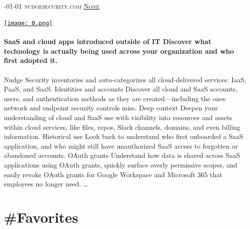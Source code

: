 \documentclass[10pt,a4paper]{article}
\begin{document}
\begin{multicols}{2}
\raggedcolumns
\noindent\begin{minipage}{\linewidth}
\medskip
\subsection{}
\textsc{\footnotesize
{\scriptsize\faCalendar}-01-01 
{\scriptsize\faGlobe}\space 
nudgesecurity.com 
{\scriptsize\faComments}\space 
\href{}{None} 
}
\par\medskip\noindent
\href{https://www.nudgesecurity.com/free-shadow-it-inventory?utm\_medium=sponsored\&utm\_source=hacker\_nl\&utm\_content=newsletter\&utm\_campaign=shadow\_it\&utm\_term=230825}{
    \texttt{[image: 0.png]}
}
\end{minipage}
\paragraph{}
\textbf{SaaS and cloud apps introduced outside of IT
Discover what technology is actually being used across your organization and who first adopted it.}
\paragraph{}
 Nudge Security inventories and auto-categorizes all cloud-delivered services: IaaS, PaaS, and SaaS.
Identities and accounts
Discover all cloud and SaaS accounts, users, and authentication methods as they are created—including the ones network and endpoint security controls miss.
Deep context
Deepen your understanding of cloud and SaaS use with visibility into resources and assets within cloud services, like files, repos, Slack channels, domains, and even billing information.
Historical use
Look back to understand who first onboarded a SaaS application, and who might still have unauthorized SaaS access to forgotten or abandoned accounts.
OAuth grants
Understand how data is shared across SaaS applications using OAuth grants, quickly surface overly permissive scopes, and easily revoke OAuth grants for Google Workspace and Microsoft 365 that employees no longer need.
\dots\par
\end{multicols}

\newpage
\section{\#Favorites}
\end{document}
